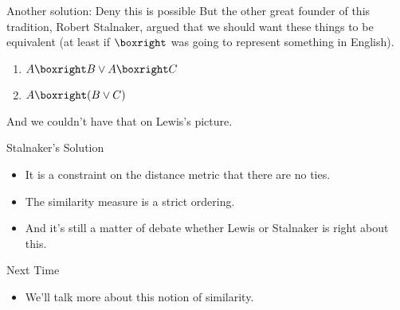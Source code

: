 \documentclass[
  ignorenonframetext,
]{beamer}
\providecommand{\tightlist}{%
  \setlength{\itemsep}{0pt}\setlength{\parskip}{0pt}}
\renewcommand{\,}{\text{, }}
\begin{document}
\begin{frame}{Another solution: Deny this is possible}
\protect\hypertarget{another-solution-deny-this-is-possible}{}
But the other great founder of this tradition, Robert Stalnaker, argued
that we should want these things to be equivalent (at least if
\(\boxright\) was going to represent something in English).

\begin{enumerate}
\tightlist
\item
  \(A \boxright B \vee A \boxright C\)
\item
  \(A \boxright (B \vee C)\)
\end{enumerate}

And we couldn't have that on Lewis's picture.
\end{frame}

\begin{frame}{Stalnaker's Solution}
\protect\hypertarget{stalnakers-solution}{}
\begin{itemize}
\tightlist
\item
  It is a constraint on the distance metric that there are no ties.
\item
  The similarity measure is a strict ordering.
\item
  And it's still a matter of debate whether Lewis or Stalnaker is right
  about this.
\end{itemize}
\end{frame}

\begin{frame}{Next Time}
\protect\hypertarget{next-time}{}
\begin{itemize}
\tightlist
\item
  We'll talk more about this notion of similarity.
\end{itemize}
\end{frame}
\end{document}
